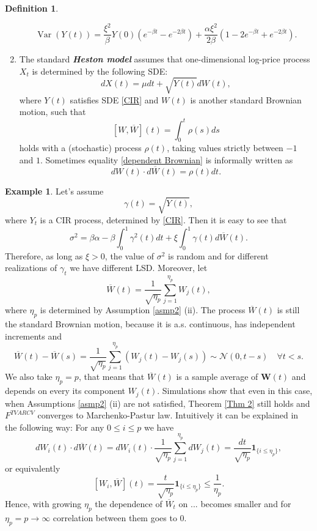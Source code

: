 \documentclass[a4paper,11pt]{article}
\theoremstyle{plain}
\theoremstyle{definition}
\newtheorem{defn}[thm]{Definition}
\newtheorem{exmp}[thm]{Example}
\newcommand{\Var}{\operatorname{Var}}
\newcommand{\define}[1]{\textit{\textbf{#1}}}
\begin{document}
\begin{defn}
\begin{enumerate}
    		\[ \Var(Y(t)) = \frac{\xi^2}{\beta} Y(0) (e^{-\beta t} - e^{-2\beta t}) + \frac{\alpha \xi^2}{2\beta}(1-2e^{-\beta t} + e^{-2\beta t}). \]
    		\item The standard \define{Heston model} assumes that one-dimensional log-price process $X_t$ is determined by the following SDE:
    		\begin{equation}
    		dX(t) = \mu dt + \sqrt{Y(t)}d{W}(t),
    		\end{equation}
    		where $Y(t)$ satisfies SDE \eqref{CIR} and ${W}(t)$ is another standard Brownian motion, such that 
    		\begin{equation} \label{dependent Brownian}
    		[{W}, \overline{W}](t) = \int_{0}^{t}\rho(s) ds
    		\end{equation}
    		holds with a (stochastic) process $\rho(t)$, taking values strictly between $-1$ and $1$. Sometimes equality \eqref{dependent Brownian} is informally written as
    		\[ d{W}(t)\cdot d\overline{W}(t) = \rho(t) dt. \]
    	\end{enumerate}
    \end{defn}
    
    \begin{exmp} \label{SimCIR}
    	Let's assume
    	\[ \gamma(t) = \sqrt{Y(t)}, \]
    	where $Y_t$ is a CIR process, determined by \eqref{CIR}. Then it is easy to see that
    	\[ \sigma^2 = \beta\alpha - \beta\int_{0}^{1} \gamma^2(t)dt + \xi \int_{0}^{1} \gamma(t) d\overline{W}(t).\]
    	Therefore, as long as $\xi > 0$, the value of $\sigma^2$ is random and for different realizations of $\gamma_t$ we have different LSD.
    	Moreover, let
    	\[ \overline{W}(t) = \frac{1}{\sqrt{\eta_p}} \sum_{j=1}^{\eta_p}W_j(t), \]
    	where $\eta_p$ is determined by Assumption \ref{asmp2} (ii). The process $\overline{W}(t)$ is still the standard Brownian motion, because it is a.s. continuous, has independent increments and
    	\[ \overline{W}(t) - \overline{W}(s) = \frac{1}{\sqrt{\eta_p}} \sum_{j=1}^{\eta_p}(W_j(t)-W_j(s)) \sim \mathcal{N}(0, t-s) \quad \forall t < s. \]
    	We also take $\eta_p = p$, that means that $\overline{W}(t)$ is a sample average of $\mathbf{W}(t)$ and depends on every its component $W_j(t)$. Simulations show that even in this case, when Assumptions \ref{asmp2} (ii) are not satisfied, Theorem \ref{Thm 2} still holds and $F^{TVARCV}$ converges to Marchenko-Pastur law. Intuitively it can be explained in the following way:
    	For any $0 \leq i \leq p$ we have
    	\[ dW_i(t) \cdot d\overline{W}(t) = dW_i(t) \cdot \frac{1}{\sqrt{\eta_p}} \sum_{j=1}^{\eta_p}dW_j(t) = \frac{dt}{\sqrt{\eta_p}} \mathbf{1}_{\{i \leq \eta_p\}}, \]
    	or equivalently 
    	\[ [W_i, \overline{W}](t) =  \frac{t}{\sqrt{\eta_p}} \mathbf{1}_{\{i \leq \eta_p\}} \leq \frac{1}{\eta_p} .  \]
    	Hence, with growing $\eta_p$ the dependence of $\overline{W}_t$ on ... becomes smaller and for $\eta_p = p \rightarrow \infty$ correlation between them goes to $0$.
    \end{exmp}
    
\end{document}
